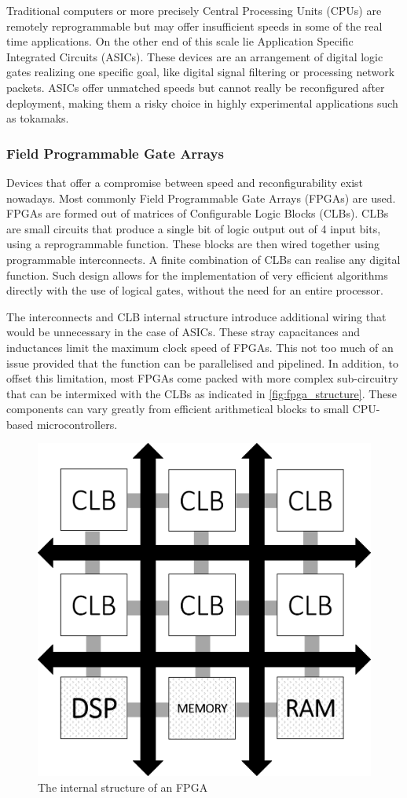 	Traditional computers or more precisely Central Processing Units (CPUs) 
	are remotely reprogrammable but may offer insufficient speeds in 
	some of the real time applications. On the other end of this scale lie 
	Application Specific Integrated Circuits (ASICs). These devices are an 
	arrangement of digital logic gates realizing one specific goal, like 
	digital signal filtering or processing network packets.
	ASICs offer unmatched speeds but cannot really be reconfigured
	after deployment, making them a risky choice in highly experimental
	applications such as tokamaks.

  \subsubsection{Field Programmable Gate Arrays}
    Devices that offer a compromise between speed and reconfigurability
    exist nowadays. Most commonly Field Programmable Gate Arrays (FPGAs) are used.
    FPGAs are formed out of matrices of Configurable Logic Blocks (CLBs).
    CLBs are small circuits that produce a single bit of logic output
    out of 4 input bits, using a reprogrammable function. These blocks 
    are then wired together using programmable interconnects.
	A finite combination of CLBs can realise any digital function.
	Such design allows for the implementation of very efficient algorithms
    directly with the use of logical gates, without the need for an
    entire processor. \cite{xilinx_what_is_fpga}


    The interconnects and CLB internal structure introduce additional wiring
    that would be unnecessary in the case of ASICs. These stray capacitances 
    and inductances limit the maximum clock speed of FPGAs. This not too much
    of an issue provided that the function can be parallelised and pipelined.
	In addition, to offset this limitation, most FPGAs come packed with 
    more complex sub-circuitry that can be intermixed with the CLBs
    as indicated in \autoref{fig:fpga_structure}.
    These components can vary greatly from efficient arithmetical blocks
    to small CPU-based microcontrollers.

    \begin{figure}[H]
      \centering
      \includegraphics[width=.6\linewidth]{media/fpga_structure.png}
      \caption{The internal structure of an FPGA}
      \label{fig:fpga_structure}
    \end{figure}
    

